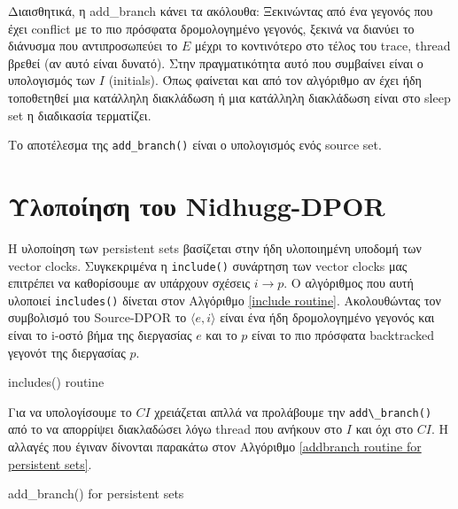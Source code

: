 Διαισθητικά, η add\_branch κάνει τα ακόλουθα: Ξεκινώντας από ένα γεγονός που έχει conflict με το πιο πρόσφατα δρομολογημένο γεγονός,
ξεκινά να διανύει το διάνυσμα που αντιπροσωπεύει το $E$ μέχρι το κοντινότερο στο τέλος του trace, thread βρεθεί (αν
αυτό είναι δυνατό). Στην πραγματικότητα αυτό που συμβαίνει είναι ο υπολογισμός των $I$ (initials). Όπως φαίνεται και από τον
αλγόριθμο αν έχει ήδη τοποθετηθεί μια κατάλληλη διακλάδωση ή μια κατάλληλη διακλάδωση είναι στο sleep set η διαδικασία 
τερματίζει.

Το αποτέλεσμα της \verb|add_branch()| είναι ο υπολογισμός ενός source set.

\section{Υλοποίηση του Nidhugg-DPOR}

Η υλοποίηση των persistent sets βασίζεται στην ήδη υλοποιημένη υποδομή των vector clocks.
Συγκεκριμένα η \verb|include()| συνάρτηση των vector clocks μας επιτρέπει να καθορίσουμε αν υπάρχουν σχέσεις $i \rightarrow p$. 
    Ο αλγόριθμος που αυτή υλοποιεί \verb|includes()| δίνεται στον Αλγόριθμο \ref{include routine}. Ακολουθώντας τον συμβολισμό του Source-DPOR το $\langle e,
i \rangle$ είναι ένα ήδη δρομολογημένο γεγονός και είναι το  i-οστό βήμα της διεργασίας $e$ και το $p$ είναι το πιο πρόσφατα backtracked
γεγονότ της διεργασίας $p$. 

\begin{algorithm}
    \caption{includes() routine}
    \label{include routine}
\end{algorithm}

Για να υπολογίσουμε το $CI$ χρειάζεται απλλά να προλάβουμε την \verb|add\_branch()| από το να απορρίψει διακλαδώσει λόγω thread  που ανήκουν στο 
$I$ και όχι στο $CI$. Η αλλαγές που έγιναν δίνονται παρακάτω στον Αλγόριθμο \ref{addbranch
routine for persistent sets}.

\begin{algorithm}
    \caption{add\_branch() for persistent sets}
    \label{addbranch routine for persistent sets}
\end{algorithm}

